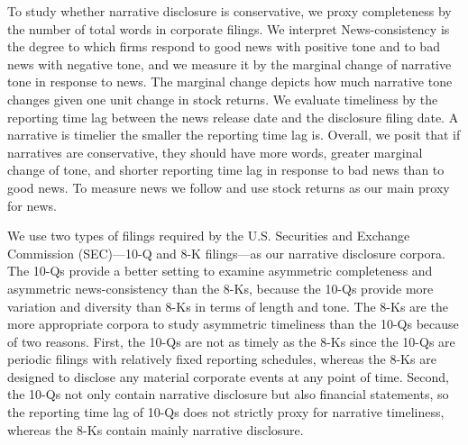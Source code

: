 \documentclass[letterpaper,11pt]{article}
\begin{document}
\begin{spacing}{1.5}
To study whether narrative disclosure is conservative, we proxy completeness by the number of total words in corporate filings. We interpret News-consistency is the degree to which firms respond to good news with positive tone and to bad news with negative tone, and we measure it by the marginal change of narrative tone in response to news. The marginal change depicts how much narrative tone changes given one unit change in stock returns. 
We evaluate timeliness by the reporting time lag between the news release date and the disclosure filing date.  A narrative is timelier the smaller the reporting time lag is. Overall, we posit that if narratives are conservative, they should have more words, greater marginal change of tone, and shorter reporting time lag in response to bad news than to good news. To measure news we follow  and use stock returns as our main proxy for news.

We use two types of filings required by the U.S. Securities and Exchange Commission (SEC)---10-Q and 8-K filings---as our narrative disclosure corpora. The 10-Qs provide a better setting to examine asymmetric completeness and asymmetric news-consistency than the 8-Ks, because the 10-Qs provide more variation and diversity than 8-Ks in terms of length and tone. The 8-Ks are the more appropriate corpora to study asymmetric timeliness than the 10-Qs because of two reasons. First, the 10-Qs are not as timely as the 8-Ks since the 10-Qs are periodic filings with relatively fixed reporting schedules, whereas the 8-Ks are designed to disclose any material corporate events at any point of time. Second, the 10-Qs not only contain narrative disclosure but also financial statements, so the reporting time lag of 10-Qs does not strictly proxy for narrative timeliness, whereas the 8-Ks contain mainly narrative disclosure.


\end{spacing}
\end{document}
